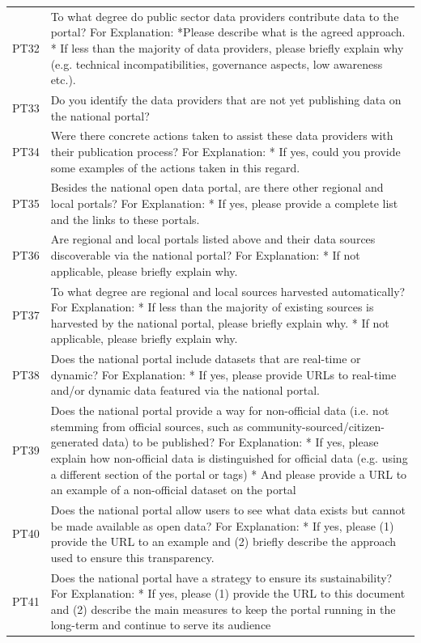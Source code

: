 {\begin{longtable}[]{@{}
  L{0.1386}
  L{0.8614}@{}}
PT32 & To what degree do public sector data providers contribute data to the portal? For Explanation: *Please describe what is the agreed approach. * If less than the majority of data providers, please briefly explain why (e.g. technical incompatibilities, governance aspects, low awareness etc.). \\
PT33 & Do you identify the data providers that are not yet publishing data on the national portal? \\
PT34 & Were there concrete actions taken to assist these data providers with their publication process? For Explanation: * If yes, could you provide some examples of the actions taken in this regard. \\
PT35 & Besides the national open data portal, are there other regional and local portals? For Explanation: * If yes, please provide a complete list and the links to these portals. \\
PT36 & Are regional and local portals listed above and their data sources discoverable via the national portal? For Explanation: * If not applicable, please briefly explain why. \\
PT37 & To what degree are regional and local sources harvested automatically? For Explanation: * If less than the majority of existing sources is harvested by the national portal, please briefly explain why. * If not applicable, please briefly explain why. \\
PT38 & Does the national portal include datasets that are real-time or dynamic? For Explanation: * If yes, please provide URLs to real-time and/or dynamic data featured via the national portal. \\
PT39 & Does the national portal provide a way for non-official data (i.e. not stemming from official sources, such as community-sourced/citizen-generated data) to be published? For Explanation: * If yes, please explain how non-official data is distinguished for official data (e.g. using a different section of the portal or tags) * And please provide a URL to an example of a non-official dataset on the portal \\
PT40 & Does the national portal allow users to see what data exists but cannot be made available as open data? For Explanation: * If yes, please (1) provide the URL to an example and (2) briefly describe the approach used to ensure this transparency. \\
PT41 & Does the national portal have a strategy to ensure its sustainability? For Explanation: * If yes, please (1) provide the URL to this document and (2) describe the main measures to keep the portal running in the long-term and continue to serve its audience \\

\end{longtable}}
